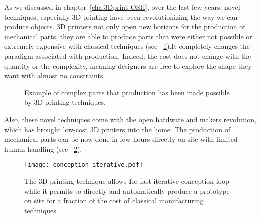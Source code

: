 As we discussed in chapter~\ref{cha:3Dprint-OSH}, over the last few years, novel techniques, especially 3D printing have been revolutionizing the way we can produce objects. 3D printers not only open new horizons for the production of mechanical parts, they are able to produce parts that were either not possible or extremely expensive with classical techniques (see \figurename~\ref{fig:complex_3D_printed_part}).It completely changes the paradigm associated with production. Indeed, the cost does not change with the quantity or the complexity, meaning designers are free to explore the shape they want with almost no constraints.

\begin{figure}[tb]
\centering
    \hfil
    \caption{Example of complex parts that production has been made possible by 3D printing techniques.}
    \label{fig:complex_3D_printed_part}
\end{figure}


Also, these novel techniques come with the open hardware and makers revolution, which has brought low-cost 3D printers into the home. The production of mechanical parts can be now done in few hours directly on site with limited human handling (see \figurename~\ref{fig:conception_loop}).

\begin{figure}[tb]
    \begin{center}
        \texttt{[image: conception\_iterative.pdf]}
    \end{center}
    \caption{The 3D printing technique allows for fast iterative conception loop while it permits to directly and automatically produce a prototype on site for a fraction of the cost of classical manufacturing techniques.}
    \label{fig:conception_loop}
\end{figure}

